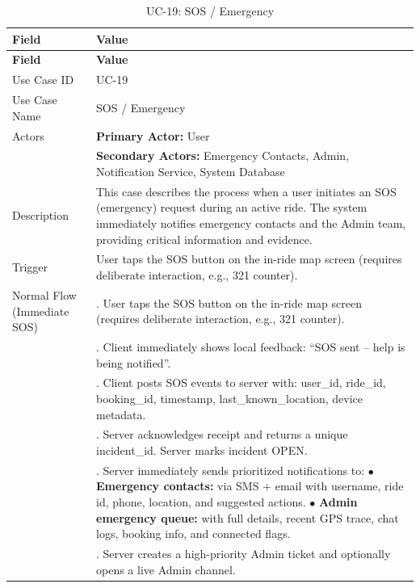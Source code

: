 \begin{longtable}{|>{\raggedright\arraybackslash}p{4cm}|>{\raggedright\arraybackslash}p{11cm}|}
\caption{UC-19: SOS / Emergency}
\label{tab:uc-19} \\
\hline
\rowcolor{lightgray!30}
\textbf{Field} & \textbf{Value} \\
\hline
\endfirsthead
\hline
\rowcolor{lightgray!30}
\textbf{Field} & \textbf{Value} \\
\hline
\endhead
\hline
\endfoot
\hline
\endlastfoot
Use Case ID & UC-19 \\
\hline
Use Case Name & SOS / Emergency \\
\hline
Actors & \textbf{Primary Actor:} User \\
& \textbf{Secondary Actors:} Emergency Contacts, Admin, Notification Service, System Database \\
\hline
Description & This case describes the process when a user initiates an SOS (emergency) request during an active ride. The system immediately notifies emergency contacts and the Admin team, providing critical information and evidence. \\
\hline
Trigger & User taps the SOS button on the in-ride map screen (requires deliberate interaction, e.g., 321 counter). \\
\hline
Normal Flow (Immediate SOS) & 1. User taps the SOS button on the in-ride map screen (requires deliberate interaction, e.g., 321 counter). \\
& 2. Client immediately shows local feedback: ``SOS sent – help is being notified''. \\
& 3. Client posts SOS events to server with: user\_id, ride\_id, booking\_id, timestamp, last\_known\_location, device metadata. \\
& 4. Server acknowledges receipt and returns a unique incident\_id. Server marks incident OPEN. \\
& 5. Server immediately sends prioritized notifications to: \newline $\bullet$ \textbf{Emergency contacts:} via SMS + email with username, ride id, phone, location, and suggested actions. \newline $\bullet$ \textbf{Admin emergency queue:} with full details, recent GPS trace, chat logs, booking info, and connected flags. \\
& 6. Server creates a high-priority Admin ticket and optionally opens a live Admin channel. \\

\end{longtable}
